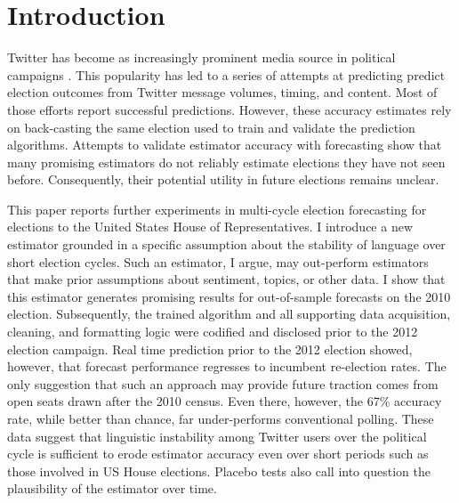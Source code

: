 \documentclass{acm_proc_article-sp}
\begin{document}
\section{Introduction}
\label{sec:introduction}

Twitter has become as increasingly prominent media source in political
campaigns \cite{economist2009,harden2009}. This popularity has led to
a series of attempts at predicting predict election outcomes from
Twitter message volumes, timing, and content. Most of those efforts
report successful predictions. However, these accuracy estimates rely
on back-casting the same election used to train and validate the
prediction algorithms. Attempts \cite{metaxas2011not} to validate
estimator accuracy with forecasting show that many promising
estimators do not reliably estimate elections they have not seen
before. Consequently, their potential utility in future elections
remains unclear.

This paper reports further experiments in multi-cycle election
forecasting for elections to the United States House of
Representatives. I introduce a new estimator grounded in a specific
assumption about the stability of language over short election
cycles. Such an estimator, I argue, may out-perform estimators that
make prior assumptions about sentiment, topics, or other data. I show
that this estimator generates promising results for out-of-sample
forecasts on the 2010 election. Subsequently, the trained algorithm
and all supporting data acquisition, cleaning, and formatting logic
were codified and disclosed prior to the 2012 election campaign. Real
time prediction prior to the 2012 election showed, however, that
forecast performance regresses to incumbent re-election rates. The
only suggestion that such an approach may provide future traction
comes from open seats drawn after the 2010 census. Even there,
however, the 67\% accuracy rate, while better than chance, far
under-performs conventional polling. These data suggest that
linguistic instability among Twitter users over the political cycle is
sufficient to erode estimator accuracy even over short periods such as
those involved in US House elections. Placebo tests also call into
question the plausibility of the estimator over time. 
\end{document}
